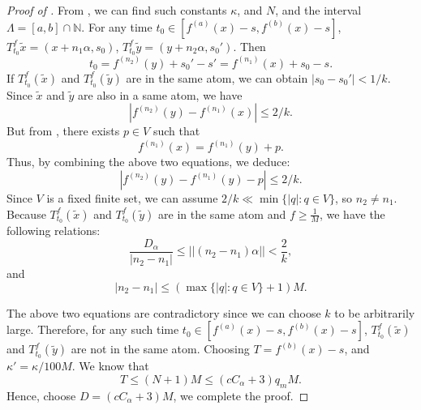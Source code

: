 \documentclass[oneside]{amsart}
\theoremstyle{plain}
\theoremstyle{definition}
\newcommand{\<}{\langle}
\renewcommand{\>}{\rangle}
\renewcommand{\|}{|\!|} %
\begin{document}
\begin{proof}[Proof of ]
From , we can find such constants $\kappa$, and $N$, and the interval $\Lambda=[a,b]\cap \mathbb{N}$. For any time $t_0\in  [f^{(a)}(x)-s,f^{(b)}(x)-s]$, 
$T_{t_0}^f{\tilde{x}}=(x+n_1\alpha,s_0)$, 
$T_{t_0}^f{\tilde{y}}=(y+n_2\alpha,s_0')$.
Then 
$$t_0=f^{(n_2)}(y)+s_0'-s'= f^{(n_1)}(x)+s_0-s.$$ 
If $T_{t_0}^f(\tilde{x})$ 
and $T_{t_0}^f(\tilde{y})$ are in the same atom, we can obtain
$|s_0-s_0'|<1/k$.
Since $\tilde{x} $ and $\tilde{y}$ are also in a same atom, we have
$$|f^{(n_2)}(y)-f^{(n_1)}(x)|\leq 2/k.$$
But from , there exists $p\in V$ such that $$f^{(n_1)}(x)=f^{(n_1)}(y)+p.$$
Thus, by combining the above two equations, we deduce:
$$|f^{(n_2)}(y)-f^{(n_1)}(y)-p|\leq 2/k.$$
Since $V$ is a fixed finite set, we can assume 
$2/k\ll \min{\{|q|: q\in V}\}$, so $n_2\neq n_1$. 
Because $T_{t_0}^f(\tilde{x})$ and $T_{t_0}^f(\tilde{y})$ are in the same atom and $f\geq \frac{1}{M}$, we have the following relations:
\begin{equation}
    \frac{D_{\alpha}}{|n_2-n_1|}\leq\|(n_2-n_1)\alpha\|<\frac{2}{k},
\end{equation}
and
\begin{equation}
|n_2-n_1|\leq (\max{\{|q|: q\in V\}}+1)M.    
\end{equation}

The above two equations are contradictory since we can choose $k$ to be arbitrarily large.
Therefore, for any such time 
$t_0\in [f^{(a)}(x)-s,f^{(b)}(x)-s] $,  $T_{t_0}^f(\tilde{x})$ and $T_{t_0}^f(\tilde{y})$ are not in the same atom.
Choosing $T=f^{(b)}(x)-s$, and $\kappa'=\kappa/100M$. We know that 
\[T\leq (N+1) M \leq (cC_{\alpha}+3)q_m M  .\]
Hence, choose \(D=(cC_{\alpha}+3)M\), we complete the proof.
\end{proof}
\end{document}
